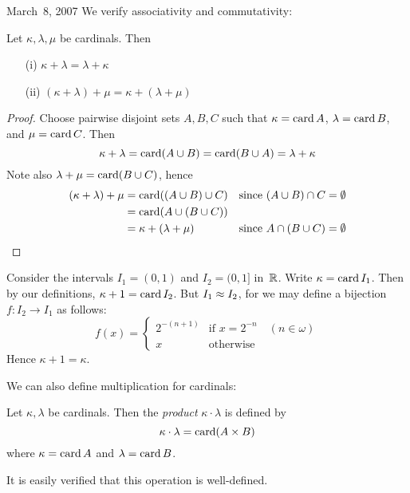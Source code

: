 \begin{lecture}{March~8, 2007}
We verify associativity and commutativity:
\begin{prop}
Let \(\kappa,\lambda,\mu\) be cardinals. Then
\begin{enumerate}[itemsep=0pt]
\item[(i)] \(\kappa+\lambda=\lambda+\kappa\)
\item[(ii)] \((\kappa+\lambda)+\mu=\kappa+(\lambda+\mu)\)
\end{enumerate}
\end{prop}
\begin{proof}
Choose pairwise disjoint sets \(A,B,C\) such that \(\kappa=\operatorname{card} A\), \(\lambda=\operatorname{card} B\), and \(\mu=\operatorname{card} C\). Then
\[\kappa+\lambda=\operatorname{card}(A\cup B)=\operatorname{card}(B\cup A)=\lambda+\kappa\]
Note also \(\lambda+\mu=\operatorname{card}(B\cup C)\), hence
\begin{align*}
(\kappa+\lambda)+\mu&=\operatorname{card}((A\cup B)\cup C)&&\text{since }(A\cup B)\cap C=\emptyset\\
					&=\operatorname{card}(A\cup(B\cup C))&&\\
					&=\kappa+(\lambda+\mu)&&\text{since }A\cap(B\cup C)=\emptyset
\end{align*}
\end{proof}
\begin{example}
Consider the intervals \(I_1=(0,1)\) and \(I_2=(0,1]\) in~\(\mathbb{R}\). Write \(\kappa=\operatorname{card} I_1\). Then by our definitions, \(\kappa+1=\operatorname{card} I_2\). But \(I_1\approx I_2\), for we may define a bijection \(f:I_2\to I_1\) as follows:
\[f(x)=\begin{cases}2^{-(n+1)}&\text{if }x=2^{-n}\quad(n\in\omega)\\x&\text{otherwise}\end{cases}\]
Hence \(\kappa+1=\kappa\).
\end{example}
We can also define multiplication for cardinals:
\begin{defn}
Let \(\kappa,\lambda\) be cardinals. Then the \emph{product} \(\kappa\cdot\lambda\) is defined by
\[\kappa\cdot\lambda=\operatorname{card}(A\times B)\]
where \(\kappa=\operatorname{card} A\) and \(\lambda=\operatorname{card} B\).
\end{defn}
\noindent It is easily verified that this operation is well-defined.
\end{lecture}
